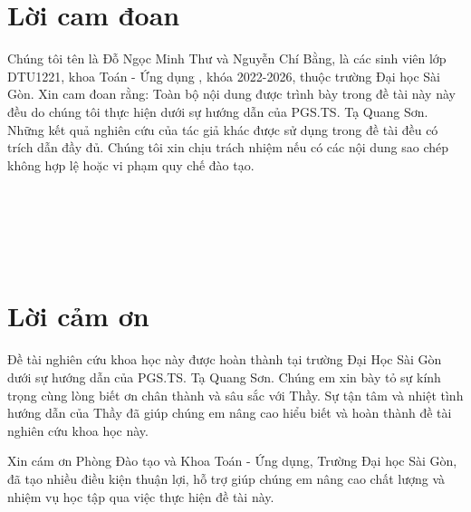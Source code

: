 \documentclass[12pt,a4paper]{report}
\begin{document}
	\renewcommand{\baselinestretch}{1.2}
	\fontsize{13pt}{20pt}\selectfont
	
	\chapter*{Lời cam đoan}
	\thispagestyle{fancy}
	\vspace{1cm}
	\indent
	
	Chúng tôi tên là Đỗ Ngọc Minh Thư và Nguyễn Chí Bằng, là các  sinh viên lớp DTU1221, khoa Toán - Ứng dụng , khóa 2022-2026,  thuộc trường Đại học Sài Gòn. 
	Xin cam đoan rằng: Toàn bộ nội dung được trình bày trong đề tài  này này đều do chúng tôi thực hiện dưới sự hướng dẫn của PGS.TS. Tạ Quang Sơn.
	Những kết quả nghiên cứu của tác giả khác được sử dụng trong đề tài  đều có trích dẫn đầy đủ. 
	Chúng tôi xin chịu trách nhiệm nếu có các nội dung sao chép không hợp lệ hoặc vi phạm quy chế đào tạo. 
	\\
	\\
	\\
	\\
	\\
	\\
	
	
	\chapter*{Lời cảm ơn}
	\thispagestyle{fancy}
	\vspace{1cm}
	\indent
	
	Đề tài nghiên cứu khoa học này được hoàn thành tại trường Đại Học Sài Gòn dưới sự hướng dẫn của PGS.TS. Tạ Quang Sơn. Chúng em xin bày tỏ sự kính trọng cùng lòng biết ơn chân thành và sâu sắc với Thầy. Sự tận tâm và nhiệt tình hướng dẫn của Thầy đã giúp chúng em nâng cao hiểu biết và hoàn thành đề tài nghiên cứu khoa học này.
	
	
	\bigskip
	Xin cám ơn Phòng Đào tạo  và Khoa Toán - Ứng dụng, Trường Đại học Sài Gòn, đã tạo nhiều điều kiện thuận lợi, hỗ trợ giúp chúng em nâng cao chất lượng và nhiệm vụ học tập qua việc thực hiện đề tài này.
	\\
	\\
	\\
	\\
	\\
	
\end{document}
